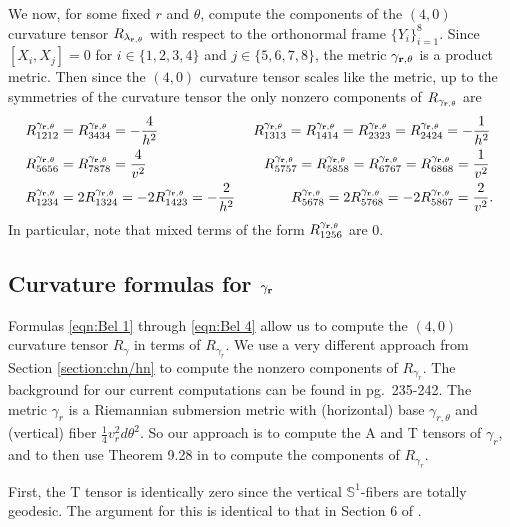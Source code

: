 \documentclass[10pt]{amsart}
\def\l{\lambda}
\def\S{\mathcal{S}}
\def\g{\gamma}
\def\th{\theta}
\def\S{\mathbb{S}}
\theoremstyle{definition}
\theoremstyle{remark}
\numberwithin{equation}{section}
\begin{document}
We now, for some fixed $r$ and $\th$, compute the components of the $(4,0)$ curvature tensor $R_{\bf \l_{r, \th}}$ with respect to the orthonormal frame $\{ Y_i \}_{i=1}^8$.  
Since $[X_i,X_j] = 0$ for $i \in \{ 1, 2, 3, 4 \}$ and $j \in \{ 5, 6, 7, 8 \}$, the metric ${\bf \g_{r, \th}}$ is a product metric.  
Then since the $(4,0)$ curvature tensor scales like the metric, up to the symmetries of the curvature tensor the only nonzero components of $R_{\bf \g_{r, \th}}$ are
	\begin{align*}
	&R^{\bf \g_{r, \th}}_{1212} = R^{\bf \g_{r, \th}}_{3434} = - \frac{4}{h^2}  \hskip 68pt  R^{\bf \g_{r, \th}}_{1313} = R^{\bf \g_{r, \th}}_{1414} = R^{\bf \g_{r, \th}}_{2323} = R^{\bf \g_{r, \th}}_{2424} = - \frac{1}{h^2}  \\
	&  R^{\bf \g_{r, \th}}_{5656} = R^{\bf \g_{r, \th}}_{7878} = \frac{4}{v^2}  \hskip 84pt  R^{\bf \g_{r, \th}}_{5757} = R^{\bf \g_{r, \th}}_{5858} = R^{\bf \g_{r, \th}}_{6767} = R^{\bf \g_{r, \th}}_{6868} = \frac{1}{v^2}  \\
	&R^{\bf \g_{r, \th}}_{1234} = 2 R^{\bf \g_{r, \th}}_{1324} = -2 R^{\bf \g_{r, \th}}_{1423} = - \frac{2}{h^2}  \hskip 40pt  R^{\bf \g_{r, \th}}_{5678} = 2 R^{\bf \g_{r, \th}}_{5768} = -2 R^{\bf \g_{r, \th}}_{5867} = \frac{2}{v^2}.
	\end{align*}
In particular, note that mixed terms of the form $R^{\bf \g_{r, \th}}_{1256}$ are $0$.



\subsection{Curvature formulas for ${\bf \g_r}$}
Formulas \eqref{eqn:Bel 1} through \eqref{eqn:Bel 4} allow us to compute the $(4,0)$ curvature tensor $R_{\g}$ in terms of $R_{\g_r}$.  
We use a very different approach from Section \ref{section:chn/hn} to compute the nonzero components of $R_{\g_r}$.
The background for our current computations can be found in \cite{Besse} pg.\ 235-242.  
The metric $\g_r$ is a Riemannian submersion metric with (horizontal) base $\g_{r, \th}$ and (vertical) fiber $\frac{1}{4} v_r^2 d \th^2$.  
So our approach is to compute the A and T tensors of $\g_r$, and to then use Theorem 9.28 in \cite{Besse} to compute the components of $R_{\g_r}$.  

First, the T tensor is identically zero since the vertical $\S^1$-fibers are totally geodesic.  
The argument for this is identical to that in Section 6 of \cite{Belegradek complex}.
\end{document}
